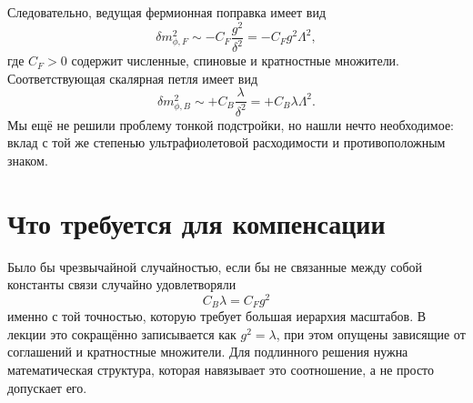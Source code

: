 \begin{classroomqa}
\end{classroomqa}

\begin{classroomqa}
\end{classroomqa}

Следовательно, ведущая фермионная поправка имеет вид
\begin{equation}
\delta m_{\phi,F}^2
\sim -C_F\frac{g^2}{\delta^2}
=-C_Fg^2\Lambda^2,
\end{equation}
где \(C_F>0\) содержит численные, спиновые и кратностные множители. Соответствующая скалярная петля имеет вид
\begin{equation}
\delta m_{\phi,B}^2
\sim+C_B\frac{\lambda}{\delta^2}
=+C_B\lambda\Lambda^2.
\end{equation}
Мы ещё не решили проблему тонкой подстройки, но нашли нечто необходимое: вклад с той же степенью ультрафиолетовой расходимости и противоположным знаком.

\section{Что требуется для компенсации}

Было бы чрезвычайной случайностью, если бы не связанные между собой константы связи случайно удовлетворяли
\begin{equation}
C_B\lambda=C_Fg^2
\end{equation}
именно с той точностью, которую требует большая иерархия масштабов. В лекции это сокращённо записывается как \(g^2=\lambda\), при этом опущены зависящие от соглашений и кратностные множители. Для подлинного решения нужна математическая структура, которая навязывает это соотношение, а не просто допускает его.

